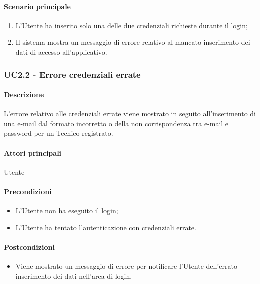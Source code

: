 \paragraph*{Scenario principale}
\begin{enumerate}
  \item L’Utente ha inserito solo una delle due credenziali richieste durante il login;
  \item Il sistema mostra un messaggio di errore relativo al mancato inserimento dei dati di accesso all’applicativo.   
\end{enumerate}


\subsubsection{UC2.2 - Errore credenziali errate}\label{UC2point2}
\paragraph*{Descrizione}
L’errore relativo alle credenziali errate viene mostrato in seguito all’inserimento di una e-mail dal formato incorretto o della non corrispondenza tra e-mail e password per un Tecnico registrato.

\paragraph*{Attori principali}
Utente

\paragraph*{Precondizioni}
\begin{itemize}
  \item L’Utente non ha eseguito il login;
  \item L’Utente ha tentato l’autenticazione con credenziali errate.  
\end{itemize}

\paragraph*{Postcondizioni}
\begin{itemize}
  \item Viene mostrato un messaggio di errore per notificare l’Utente dell’errato inserimento dei dati nell’area di login.
\end{itemize}

